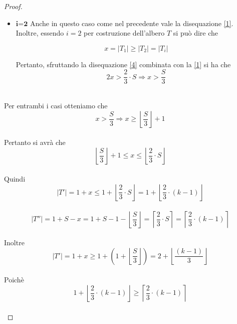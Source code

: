 \begin{proof}
\begin{itemize}
	\begin{equation}\label{2}
	|T_i| \le \frac{S}{i} \le \frac{S}{3}	
	\end{equation}
\\
		
	Sottraendo la disequazione \eqref{2} alla \eqref{1} si ottiene che 
	\\
	\begin{equation}\label{3}
	x > \frac{2}{3}\cdot S - \frac{S}{3} = \frac{S}{3}	
	\end{equation}
\\
 	\item $ \textbf{i=2} $ Anche in questo caso come nel precedente vale la disequazione \eqref{1}.\\
 	Inoltre, essendo $ i = 2 $ per costruzione dell'albero $ T $ si pu\`o dire che
 	
 	\begin{equation}\label{4}
 	x = |T_1| \ge |T_2| = |T_i|
 	\end{equation}
 	
 	Pertanto, sfruttando la disequazione \eqref{4} combinata con la \eqref{1} si ha che
 	\begin{equation}\label{5}
 	2x > \frac{2}{3} \cdot S \Rightarrow x > \frac{S}{3}
 	\end{equation}
	\end{itemize}\mbox{}\\


Per entrambi i casi otteniamo che 
\\
\[ x > \frac{S}{3} \Rightarrow x \ge \left\lfloor \frac{S}{3}\right\rfloor  + 1 \]
\\

Pertanto si avr\`a che 
\\
\[ \left\lfloor \frac{S}{3}\right\rfloor  + 1 \le x \le \left\lfloor \frac{2}{3}\cdot S \right\rfloor \] 
\\

Quindi 
\\
\begin{equation}\label{5}
|T'| = 1+x \le 1 + \left\lfloor \frac{2}{3}\cdot S \right\rfloor = 1 + \left\lfloor \frac{2}{3} \cdot (k-1) \right\rfloor	
\end{equation}
\\
\begin{equation}\label{6}
|T''| = 1 + S - x = 1+S-1 - \left\lfloor \frac{S}{3}\right\rfloor = \left\lceil \frac{2}{3}\cdot S \right\rceil = \left\lceil \frac{2}{3} \cdot (k-1) \right\rceil 	
\end{equation}
\\
Inoltre
\\
\[ |T'| = 1+ x \ge 1+ (1 +  \left\lfloor \frac{S}{3}\right\rfloor ) = 2 +  \left\lfloor \frac{(k-1)}{3}\right\rfloor\]
\\
Poich\`e
\\
 	 \[1 + \left\lfloor \frac{2}{3} \cdot (k-1) \right\rfloor \ge \left\lceil \frac{2}{3} \cdot (k-1) \right\rceil \]
 	 \\


\end{proof}
